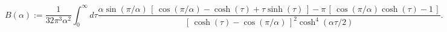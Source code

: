 \begin{equation} 
B(\alpha) := \frac{1}{32\pi^3\alpha^2}\int_0^\infty\! d\tau
\frac{\alpha\sin(\pi/\alpha)\,
[\, \cos(\pi/\alpha) -\cosh(\tau)+
\tau\sinh(\tau)\, ] - 
\pi\, [\, \cos(\pi/\alpha)\cosh(\tau)-1\, ]}
{[\,\cosh(\tau)-\cos(\pi/\alpha)\,]^2\cosh^4(\alpha\tau/2)}.
\label{I}
\end{equation}

